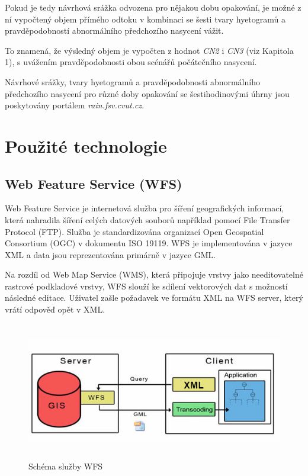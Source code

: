\documentclass[a4paper,oneside,12pt]{book}
\begin{document}
\hspace{10mm} Pokud je tedy návrhová srážka odvozena pro nějakou dobu opakování, je možné z ní vypočtený objem přímého odtoku v kombinaci se šesti tvary  hyetogramů a pravděpodobností abnormálního předchozího nasycení vážit.

\hspace{10mm} To znamená, že výsledný objem je vypočten z hodnot \textit{CN2} i \textit{CN3} (viz Kapitola 1), s uvážením pravděpodobnosti obou scénářů počátečního nasycení.

\hspace{10mm} Návrhové srážky, tvary hyetogramů a pravděpodobnosti abnormálního předchozího nasycení pro různé doby opakování se šestihodinovými úhrny jsou poskytovány portálem \textit{rain.fsv.cvut.cz}.

\newpage
\newpage

\chapter{Použité technologie} \label{tehcnologie}

\section{Web Feature Service (WFS)} \label{wfs}
\hspace{10mm} Web Feature Service je internetová služba pro šíření geografických informací, která nahradila šíření celých datových souborů například pomocí File Transfer Protocol (FTP). Služba je standardizována organizací Open Geospatial Consortium (OGC) v dokumentu  ISO 19119. \cite{Vretanos2014} WFS je implementována v jazyce XML a data jsou reprezentována primárně v jazyce GML. \cite{Zhang2005}

\hspace{10mm} Na rozdíl od Web Map Service (WMS), která připojuje vrstvy jako needitovatelné rastrové podkladové vrstvy, WFS slouží ke sdílení vektorových dat s možností následné editace. Uživatel zašle požadavek ve formátu XML na WFS server, který vrátí odpověď opět v XML. \cite{Zhang2005}

\begin{figure}[ht] \label{obr5}
\centering
\includegraphics[height=6cm]{pictures/XML.png}
\caption{Schéma služby WFS \cite{Schall2009}}
\label{fig:xml}
\end{figure}
\end{document}
